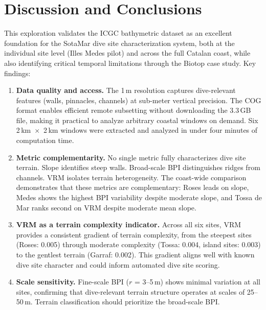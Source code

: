 \documentclass[a4paper,11pt]{article}
\begin{document}
\section{Discussion and Conclusions}
\label{sec:conclusions}

This exploration validates the ICGC bathymetric dataset as an excellent foundation for
the SotaMar dive site characterization system, both at the individual site level (Illes
Medes pilot) and across the full Catalan coast, while also identifying critical temporal
limitations through the Biotop case study. Key findings:

\begin{enumerate}
\item \textbf{Data quality and access.} The 1\,m resolution captures dive-relevant
    features (walls, pinnacles, channels) at sub-meter vertical precision. The COG format
    enables efficient remote subsetting without downloading the 3.3\,GB file, making it
    practical to analyze arbitrary coastal windows on demand. Six 2\,km~$\times$~2\,km
    windows were extracted and analyzed in under four minutes of computation time.

\item \textbf{Metric complementarity.} No single metric fully characterizes dive site
    terrain. Slope identifies steep walls. Broad-scale BPI distinguishes ridges from
    channels. VRM isolates terrain heterogeneity. The coast-wide comparison demonstrates
    that these metrics are complementary: Roses leads on slope, Medes shows
    the highest BPI variability despite moderate slope, and Tossa de Mar
    ranks second on VRM despite moderate mean slope.

\item \textbf{VRM as a terrain complexity indicator.} Across all six sites, VRM
    provides a consistent gradient of terrain complexity, from the steepest sites
    (Roses: 0.005) through moderate complexity (Tossa: 0.004, island sites: 0.003)
    to the gentlest terrain (Garraf: 0.002). This gradient aligns well with known
    dive site character and could inform automated dive site scoring.

\item \textbf{Scale sensitivity.} Fine-scale BPI ($r$ = 3--5\,m) shows minimal variation
    at all sites, confirming that dive-relevant terrain structure operates at scales of
    25--50\,m. Terrain classification should prioritize the broad-scale BPI.


\end{enumerate}
\end{document}
